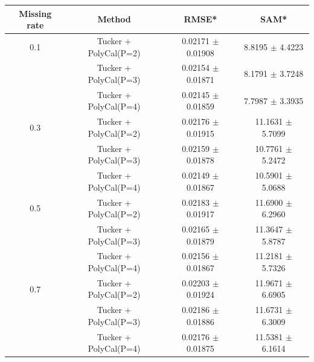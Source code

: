 \begin{tabular}{c|c|c|c}
    \hline
    Missing rate & Method & RMSE* & SAM* \\
    \hline
    0.1 & Tucker + PolyCal(P=2) & 0.02171 $\pm$ 0.01908 & 8.8195 $\pm$ 4.4223 \\
     & Tucker + PolyCal(P=3) & 0.02154 $\pm$ 0.01871 & 8.1791 $\pm$ 3.7248 \\
     & Tucker + PolyCal(P=4) & 0.02145 $\pm$ 0.01859 & 7.7987 $\pm$ 3.3935 \\
    0.3 & Tucker + PolyCal(P=2) & 0.02176 $\pm$ 0.01915 & 11.1631 $\pm$ 5.7099 \\
     & Tucker + PolyCal(P=3) & 0.02159 $\pm$ 0.01878 & 10.7761 $\pm$ 5.2472 \\
     & Tucker + PolyCal(P=4) & 0.02149 $\pm$ 0.01867 & 10.5901 $\pm$ 5.0688 \\
    0.5 & Tucker + PolyCal(P=2) & 0.02183 $\pm$ 0.01917 & 11.6900 $\pm$ 6.2960 \\
     & Tucker + PolyCal(P=3) & 0.02165 $\pm$ 0.01879 & 11.3647 $\pm$ 5.8787 \\
     & Tucker + PolyCal(P=4) & 0.02156 $\pm$ 0.01867 & 11.2181 $\pm$ 5.7326 \\
    0.7 & Tucker + PolyCal(P=2) & 0.02203 $\pm$ 0.01924 & 11.9671 $\pm$ 6.6905 \\
     & Tucker + PolyCal(P=3) & 0.02186 $\pm$ 0.01886 & 11.6731 $\pm$ 6.3009 \\
     & Tucker + PolyCal(P=4) & 0.02176 $\pm$ 0.01875 & 11.5381 $\pm$ 6.1614 \\
    \hline
\end{tabular}

